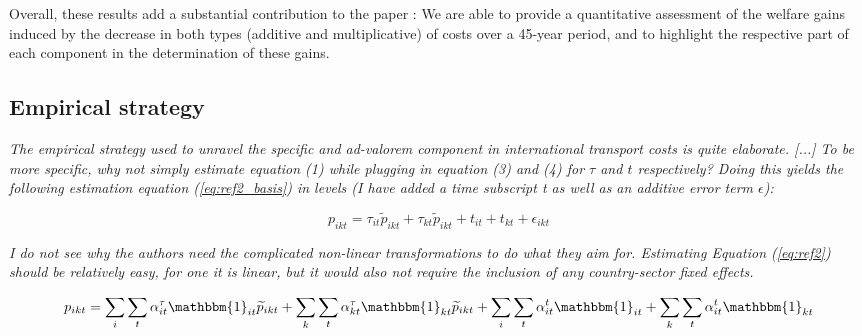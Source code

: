 \documentclass[a4paper,11pt]{article}
\begin{document}
Overall, these results add a substantial contribution to the paper : We are able to provide a quantitative assessment of the welfare gains induced by the decrease in both types (additive and multiplicative) of costs over a 45-year period, and to highlight the respective part of each component in the determination of these gains.






\subsection{Empirical strategy}

\textit{The empirical strategy used to unravel the specific and ad-valorem component in international
transport costs is quite elaborate. [...] To be more specific, why not simply estimate equation (1) while plugging
in equation (3) and (4) for $\tau$ and $t$ respectively? Doing this yields the following estimation equation (\ref{eq:ref2_basis}) in
levels (I have added a time subscript t as well as an additive error term $\epsilon$):}

\begin{equation}
p_{ikt}=\tau_{it}\widetilde{p}_{ikt}+ \tau_{kt}\widetilde{p}_{ikt} + t_{it} + t_{kt} + \epsilon_{ikt}   \label{eq:ref2_basis}
\end{equation}

\textit{I do not see why the authors need the complicated non-linear transformations to do what they aim
for. Estimating Equation (\ref{eq:ref2}) should be relatively easy, for one it is linear, but it would also not require the
inclusion of any country-sector fixed effects.}

\begin{equation}
p_{ikt}= \sum_i \sum_t \alpha_{it}^\tau \mathbbm{1}_{it}\widetilde{p}_{ikt} +  \sum_k \sum_t \alpha_{kt}^\tau \mathbbm{1}_{kt}\widetilde{p}_{ikt} + \sum_i \sum_t \alpha_{it}^t \mathbbm{1}_{it} + \sum_k \sum_t \alpha_{it}^t\mathbbm{1}_{kt} \label{eq:ref2}
\end{equation}
\end{document}
